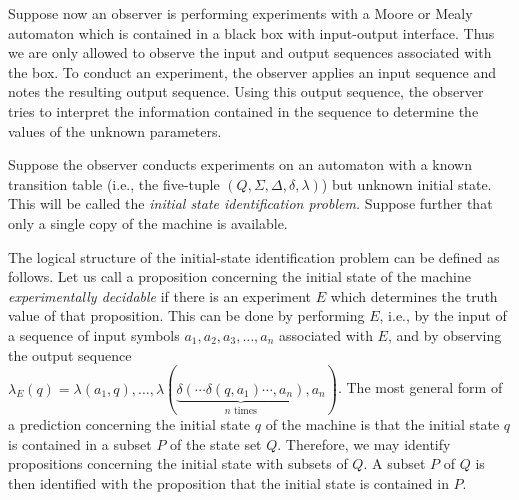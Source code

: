 Suppose now an observer is performing experiments with a Moore or
Mealy automaton which is contained in a black box
with input-output interface.
Thus we are only allowed to observe
the input and output sequences associated with the box.
To conduct an experiment, the observer applies an input sequence
and notes the resulting output sequence.
Using this output sequence, the observer tries to interpret the
information contained in the sequence to determine the values of the
unknown parameters.

Suppose the observer conducts experiments on an automaton with a
known
transition table (i.e., the five-tuple $(Q,\Sigma,\Delta,\delta,\lambda)$)
but unknown initial state. This will be called the {\em initial state
identification problem.} Suppose further
that only a single copy of the
machine is available.

The logical structure of the initial-state identification problem can be
defined as follows. Let us call a proposition concerning the initial
state of the machine
{\em experimentally decidable} if there is an experiment $E$ which
determines the truth value of that proposition.
This can be done by performing $E$, i.e., by the input of a sequence of
input symbols $a_1,a_2,a_3,\ldots ,a_n$ associated with $E$, and by
observing the output sequence
\\
$\lambda_E(q)=\lambda(a_1,q), \ldots ,\lambda(\underbrace{\delta
(\cdots
\delta
(q,a_1)\cdots ,a_n)}_{n \mbox{ times}},a_n)$.
The most general form of a prediction concerning the
initial state $q$
of the machine is that the initial state $q$ is contained in a subset $P$ of the
state set $Q$.
Therefore, we may identify propositions concerning the initial state
with subsets of $Q$.
A subset $P$ of $Q$ is then  identified with the proposition that the
initial state is contained in $P$.

